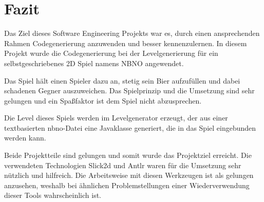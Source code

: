 \section{Fazit}

Das Ziel dieses Software Engineering Projekts war es, durch einen ansprechenden Rahmen Codegenerierung anzuwenden und besser kennenzulernen. In diesem Projekt wurde die Codegenerierung bei der Levelgenerierung für ein selbstgeschriebenes 2D Spiel namens NBNO angewendet.

Das Spiel hält einen Spieler dazu an, stetig sein Bier aufzufüllen und dabei schadenen Gegner auszuweichen. Das Spielprinzip und die Umsetzung sind sehr gelungen und ein Spaßfaktor ist dem Spiel nicht abzusprechen.

Die Level dieses Spiels werden im Levelgenerator erzeugt, der aus einer textbasierten nbno-Datei eine Javaklasse generiert, die in das Spiel eingebunden werden kann.

Beide Projektteile sind gelungen und somit wurde das Projektziel erreicht. Die verwendeten Technologien Slick2d und Antlr waren für die Umsetzung sehr nützlich und hilfreich. Die Arbeitsweise mit diesen Werkzeugen ist als gelungen anzusehen, weshalb bei ähnlichen Problemstellungen einer Wiederverwendung dieser Tools wahrscheinlich ist.